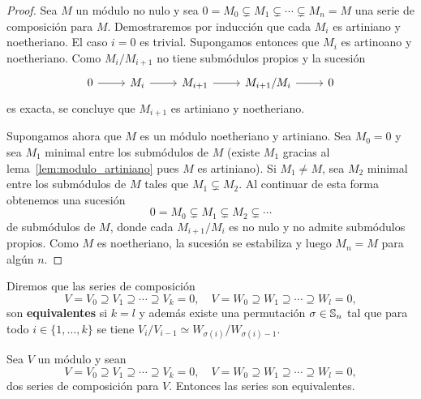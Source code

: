\begin{proof}
	Sea $M$ un módulo no nulo y sea $0=M_0\subsetneq
	M_1\subsetneq\cdots\subsetneq M_n=M$ una serie de composición para $M$.
	Demostraremos por inducción que cada $M_i$ es artiniano y noetheriano. El
	caso $i=0$ es trivial. Supongamos entonces que $M_i$ es artinoano y
	noetheriano. Como $M_i/M_{i+1}$ no tiene submódulos propios y la sucesión 
	\[
	\begin{tikzcd}
		0 \arrow{r}
		& M_i \arrow{r}
		& M_{i+1} \arrow{r}
		& M_{i+1}/M_i \arrow{r}
		& 0
	\end{tikzcd}
	\]
	es exacta, se concluye que $M_{i+1}$ es artiniano y noetheriano. 

	Supongamos ahora que $M$ es un módulo noetheriano y artiniano. Sea $M_0=0$
	y sea $M_1$ minimal entre los submódulos de $M$ (existe $M_1$ gracias al
	lema~\ref{lem:modulo_artiniano} pues $M$ es artiniano). Si $M_1\ne M$, sea
	$M_2$ minimal entre los submódulos de $M$ tales que $M_1\subsetneq M_2$. Al
	continuar de esta forma obtenemos una sucesión
	\[
		0=M_0\subsetneq M_1\subsetneq M_2\subsetneq\cdots
	\]
	de submódulos de $M$, donde cada $M_{i+1}/M_i$ es no nulo y no admite
	submódulos propios. Como $M$ es noetheriano, la sucesión se estabiliza y
	luego $M_n=M$ para algún $n$. 
\end{proof}

\begin{definition}
	Diremos que las series de composición 
	\[
	V=V_0\supseteq V_1\supseteq\cdots\supseteq V_k=0,
	\quad
	V=W_0\supseteq W_1\supseteq\cdots\supseteq W_l=0,
	\]
	son \textbf{equivalentes} si $k=l$ y además existe una permutación
	$\sigma\in\mathbb{S}_n$ tal que para todo $i\in\{1,\dots,k\}$ se tiene
	$V_{i}/V_{i-1}\simeq W_{\sigma(i)}/W_{\sigma(i)-1}$.
\end{definition}

\begin{theorem}
	\label{thm:JordanHolder}
	Sea $V$ un módulo y sean 
	\[
		V=V_0\supseteq V_1\supseteq\cdots\supseteq V_k=0,
		\quad
		V=W_0\supseteq W_1\supseteq\cdots\supseteq W_l=0,
	\]
	dos series de composición para $V$. Entonces las series son
	equivalentes.
\end{theorem}

